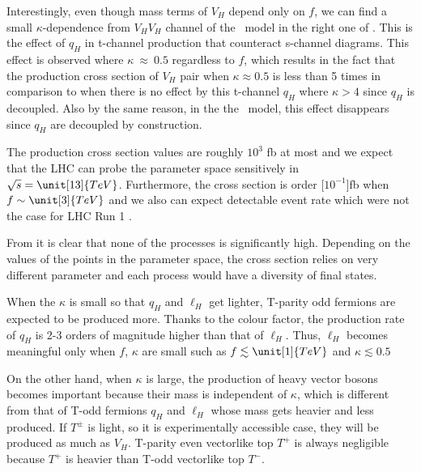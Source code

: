 
Interestingly, even though mass terms of $V_H$ depend only on $f$, we can find a small $\kappa$-dependence from $V_H V_H$ channel of the \fu~model
in the right one of . This is the effect of $q_H$ in t-channel production that counteract s-channel diagrams. 
This effect is observed where $\kappa~\approx~0.5$ regardless to $f$,
which results in the fact that the production cross section of $V_H$ pair when $\kappa \approx 0.5$ is less than 5 times
in comparison to when there is no effect by this t-channel $q_H$ where $\kappa > 4$ since $q_H$ is decoupled. 
Also by the same reason, in the  the \hq~model, this effect disappears since $q_H$ are decoupled by construction. 

The production cross section values are roughly $10^3$ fb at most  
and we expect that the LHC can probe the parameter space sensitively in $\sqrt{s} = \unit[13]{TeV}$. 
Furthermore, the cross section is order \unit[$10^{-1}$]{fb} when $f\sim\unit[3]{TeV}$ and
we also can expect detectable event rate which were not the case for LHC Run 1 . 

From  it is clear that none of the processes is significantly high. 
Depending on the values of the points in the parameter space, the cross section relies on very different parameter 
and each process would have a diversity of final states.


When the $\kappa$ is small so that $q_H$ and $\ell_H$ get lighter, 
T-parity odd fermions are expected to be produced more. 
Thanks to the colour factor, the production rate of $q_H$ is 2-3 orders of magnitude higher
than that of $\ell_H$. Thus, $\ell_H$ becomes meaningful only when $f$, $\kappa$ are small 
such as $f \lesssim \unit[1]{TeV}$ and $\kappa \lesssim 0.5$

On the other hand, when $\kappa$ is large, 
the production of heavy vector bosons becomes important 
because their mass is independent of $\kappa$, which is different from that of T-odd fermions
$q_H$ and $\ell_H$ whose mass gets heavier and less produced. 
If $T^\pm$ is light, so it is experimentally accessible case, 
they will be produced as much as $V_H$. 
T-parity even vectorlike top $T^+$ is always negligible 
because $T^+$ is heavier than T-odd vectorlike top $T^-$. 



